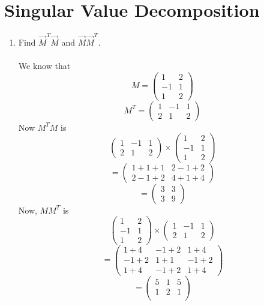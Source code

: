 \documentclass[journal,12pt,twocolumn]{IEEEtran}
\renewcommand\thesection{\arabic{section}}
\begin{document}
\section{Singular Value Decomposition}
\begin{enumerate}[label=\thesection.\arabic*.,ref=\thesection.\theenumi]

\item Find $\vec{M}^T\vec{M}$ and $\vec{M}\vec{M}^T$.\\
\solution\\
We know that
$$M=
\begin{pmatrix}
1 & 2 \\
-1 & 1 \\
1 & 2
\end{pmatrix}
$$
$$M^T=
\begin{pmatrix}
1 & -1 & 1\\
2 & 1 & 2 
\end{pmatrix}
$$
Now $M^T M$ is
$$
\begin{pmatrix}
1 & -1 & 1\\
2 & 1 & 2
\end{pmatrix} \times
\begin{pmatrix}
1 & 2\\
-1 & 1\\
1 & 2
\end{pmatrix}
$$
$$
=\begin{pmatrix}
1+1+1 & 2-1+2\\
2-1+2 & 4+1+4
\end{pmatrix}
$$
$$
=\begin{pmatrix}
3 & 3\\
3 & 9
\end{pmatrix}
$$
Now, $MM^T$ is\\
$$
\begin{pmatrix}
1 & 2\\
-1 & 1\\
1 & 2
\end{pmatrix} \times
\begin{pmatrix}
1 & -1 & 1\\
2 & 1 & 2
\end{pmatrix} 
$$
$$
=\begin{pmatrix}
1+4 & -1+2 & 1+4\\
-1+2 & 1+1 &-1+2\\
1+4 & -1+2 & 1+4
\end{pmatrix}
$$
$$
=\begin{pmatrix}
5 & 1 & 5\\
1 & 2 & 1\\

\end{pmatrix}$$
\end{enumerate}
\end{document}
